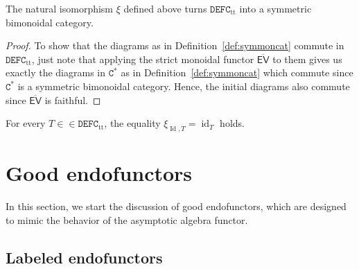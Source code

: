 \documentclass[10pt]{simplearticle}
\newcommand{\id}{\operatorname{id}}
\newcommand{\Id}{\operatorname{Id}}
\newcommand{\DEFC}{\mathbb{\mathtt{DEFC}}}
\newcommand{\Cstar}{\mathtt{C^{*}}}
\newcommand{\mathsb}[1]{\boldsymbol{\mathsf{#1}}}
\newcommand{\EV}{\mathsb{EV}}
\newcommand{\ttt}{\operatorname{tt}}
\begin{document}
\begin{prop}\label{prop:xitt}
The
natural isomorphism $\xi$
defined above turns $\DEFC_{\ttt}$ into a symmetric bimonoidal category.
\end{prop}

\begin{proof}
To show that the diagrams as in Definition~\ref{def:symmoncat} commute
in $\DEFC_{\ttt}$, just note that applying the strict monoidal functor
$\overline{\EV}$ to them gives us exactly the diagrams in $\Cstar$
as in Definition~\ref{def:symmoncat} which commute since $\Cstar$
is a symmetric bimonoidal category. Hence, the initial diagrams also
commute since $\overline{\EV}$ is faithful.
\end{proof}

\begin{rem}\label{rem:xiid}
For
every $T\in\in\DEFC_{\ttt}$,
the equality $\xi_{\Id,T}=\id_{T}$ holds.
\end{rem}
\section{Good endofunctors}

In this section, we start the discussion of good endofunctors, which
are designed to mimic the behavior of the asymptotic algebra functor.

\subsection{\label{subsec:labeled-end}Labeled endofunctors}
\end{document}
